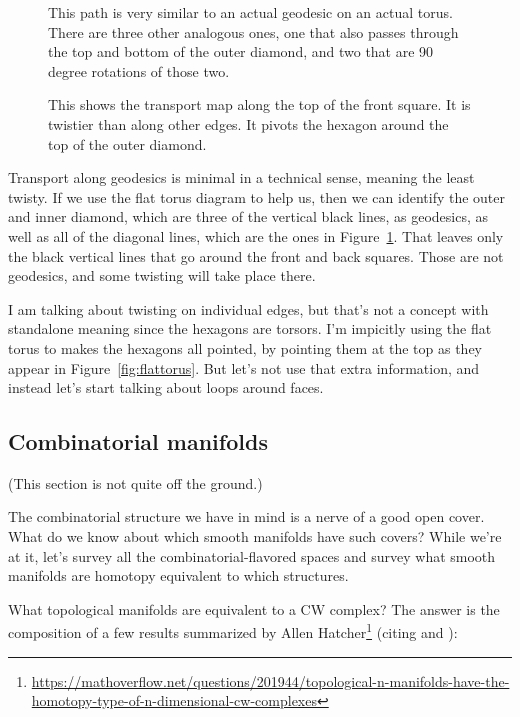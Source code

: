 \begin{figure}[h]
\centering

\caption{This path is very similar to an actual geodesic on an actual torus. There are three other analogous ones, one that also passes through the top and bottom of the outer diamond, and two that are 90 degree rotations of those two.}
\label{fig:torus_geodesic}
\end{figure}

\begin{figure}[h]
\centering


\caption{This shows the transport map along the top of the front square. It is twistier than along other edges. It pivots the hexagon around the top of the outer diamond.}
\label{fig:torus_twist}
\end{figure}

Transport along geodesics is minimal in a technical sense, meaning the least twisty. If we use the flat torus diagram to help us, then we can identify the outer and inner diamond, which are three of the vertical black lines, as geodesics, as well as all of the diagonal lines, which are the ones in Figure~\ref{fig:torus_geodesic}. That leaves only the black vertical lines that go around the front and back squares. Those are not geodesics, and some twisting will take place there.

I am talking about twisting on individual edges, but that's not a concept with standalone meaning since the hexagons are torsors. I'm impicitly using the flat torus to makes the hexagons all pointed, by pointing them at the top as they appear in Figure~\ref{fig:flattorus}. But let's not use that extra information, and instead let's start talking about loops around faces.


\subsection{Combinatorial manifolds}

(This section is not quite off the ground.)

The combinatorial structure we have in mind is a nerve of a good open cover. What do we know about which smooth manifolds have such covers? While we're at it, let's survey all the combinatorial-flavored spaces and survey what smooth manifolds are homotopy equivalent to which structures.

What topological manifolds are equivalent to a CW complex? The answer is the composition of a few results summarized by Allen Hatcher\footnote{\url{https://mathoverflow.net/questions/201944/topological-n-manifolds-have-the-homotopy-type-of-n-dimensional-cw-complexes}} (citing \cite{kirby_siebenmann} and \cite{freedman_quinn}):

